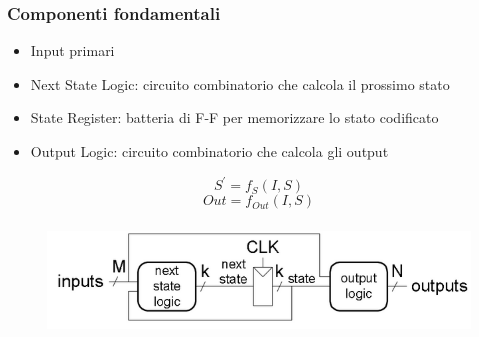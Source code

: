 \documentclass{report}
\begin{document}
        \subsubsection{Componenti fondamentali}
            \begin{itemize}:
                \item Input primari
                \item Next State Logic: circuito combinatorio che calcola il prossimo stato
                \item State Register: batteria di F-F per memorizzare lo stato codificato
                \item Output Logic: circuito combinatorio che calcola gli output
            \end{itemize}
            $$S^{'} = f_{S}\left(I, S\right)$$
            $$Out = f_{Out}\left(I, S\right)$$
            \begin{center}
                \begin{figure}[H]
                    \includegraphics[width=\textwidth, height=3cm]{mealyfsm.png}
                \end{figure}
            \end{center}
\end{document}
